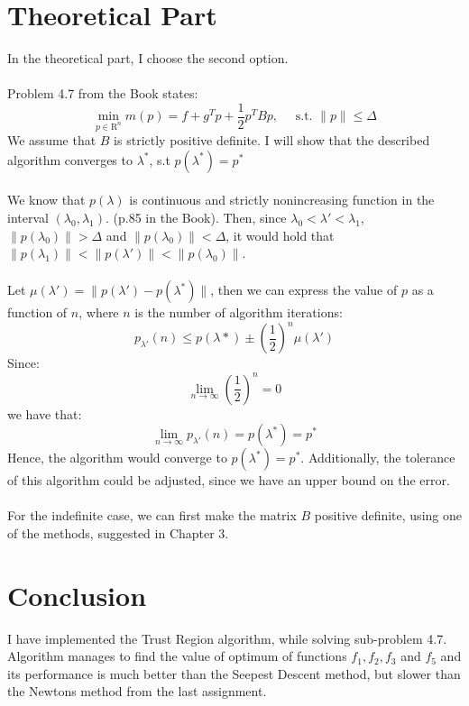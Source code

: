 \documentclass[a4paper]{article}
\begin{document}
\section{Theoretical Part}
In the theoretical part, I choose the second option. \\\\
Problem 4.7 from the Book states:
\[
\min _{p \in \mathrm{R}^{n}} m(p)=f+g^{T} p+\frac{1}{2} p^{T} B p, \quad \text { s.t. }\|p\| \leq \Delta
\]
We assume that $B$ is strictly positive definite. I
will show that the described algorithm converges to $\lambda^*$, s.t
$p(\lambda^*) = p^*$\\\\
We know that $p(\lambda)$ is continuous and
strictly nonincreasing function in the interval $(\lambda_0, \lambda_1)$. (p.85
in the Book). Then, since $\lambda_0 < \lambda' < \lambda_1$,
$\|p(\lambda_0)\| > \Delta$ and $\|p(\lambda_0)\| < \Delta$, it would
hold that $\|p(\lambda_1)\| <  \|p(\lambda')\| < \|p(\lambda_0)\|$. \\\\
Let $\mu(\lambda') = \| p(\lambda') - p(\lambda^{*}) \|$, then we can express
the value of $p$ as a function of $n$, where $n$ is the number of algorithm
iterations:
\[
p_{\lambda'}(n) \leq p(\lambda*) \pm \left(\frac{1}{2}\right)^n\!\mu(\lambda')
\]
Since:
\[
\lim_{n \to \infty} \left(\frac{1}{2}\right)^n = 0
\]
we have that:
\[
\lim_{n \to \infty} p_{\lambda'}(n) = p(\lambda^{*}) = p^{*}
\]
Hence, the algorithm would converge to $p(\lambda^*) = p^*$. Additionally, the
tolerance of this algorithm could be adjusted, since we have an
upper bound on the error. \\\\
For the indefinite case, we can first make the matrix $B$ positive definite, using
one of the methods, suggested in Chapter 3.

\section{Conclusion}
I have implemented the Trust Region algorithm, while solving sub-problem 4.7.
Algorithm manages to find the value of optimum of functions $f_1, f_2, f_3$ and
$f_5$ and its performance is much better than the Seepest Descent method, but
slower than the Newtons method from the last assignment.
\end{document}
